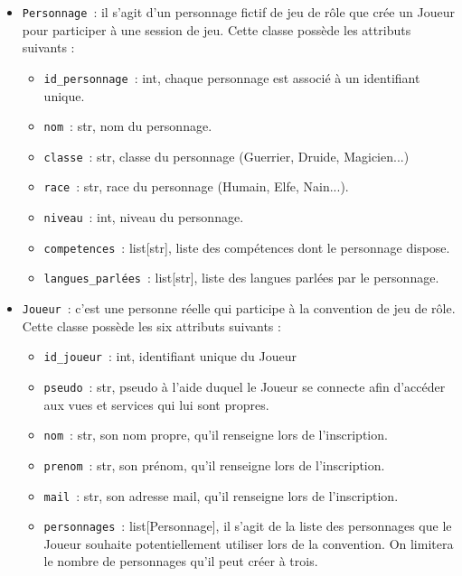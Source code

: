 \documentclass[11pt]{article}
\begin{document}
\begin{itemize}
    \item \texttt{Personnage}~: il s'agit d'un personnage fictif de jeu de rôle que crée un Joueur pour participer à une session de jeu. Cette classe possède les attributs suivants :
    \begin{itemize}[label=, font=\small]
        \item \texttt{id\_personnage}~: int, chaque personnage est associé à un identifiant unique.
        \item \texttt{nom}~: str, nom du personnage.
        \item \texttt{classe}~: str, classe du personnage (Guerrier, Druide, Magicien...)
        \item \texttt{race}~: str, race du personnage (Humain, Elfe, Nain...).
        \item \texttt{niveau}~: int, niveau du personnage.
        \item \texttt{competences}~: list[str], liste des compétences dont le personnage dispose.
        \item \texttt{langues\_parlées}~: list[str], liste des langues parlées par le personnage.
    \end{itemize}

    \item \texttt{Joueur}~: c'est une personne réelle qui participe à la convention de jeu de rôle. Cette classe possède les six attributs suivants :
    \begin{itemize}[label=, font=\small]
        \item \texttt{id\_joueur}~: int, identifiant unique du Joueur
        \item \texttt{pseudo}~: str, pseudo à l'aide duquel le Joueur se connecte afin d'accéder aux vues et services qui lui sont propres.
        \item \texttt{nom}~: str, son nom propre, qu'il renseigne lors de l'inscription.
        \item \texttt{prenom}~: str, son prénom, qu'il renseigne lors de l'inscription.
        \item \texttt{mail}~: str, son adresse mail, qu'il renseigne lors de l'inscription.
        \item \texttt{personnages}~: list[Personnage], il s'agit de la liste des personnages que le Joueur souhaite potentiellement utiliser lors de la convention. On limitera le nombre de personnages qu'il peut créer à trois.
    \end{itemize}
\end{itemize}
\end{document}
